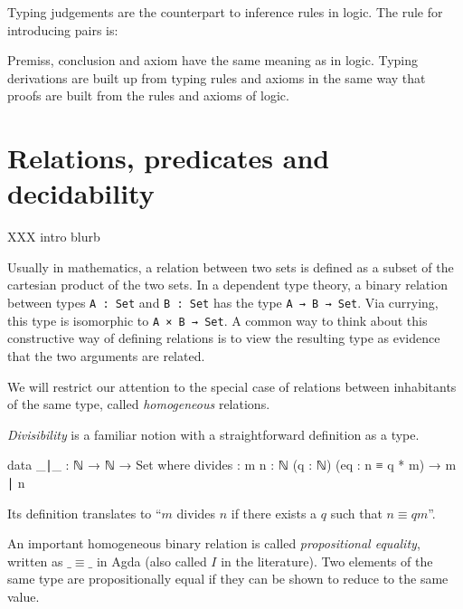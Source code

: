 Typing judgements are the counterpart to inference rules in logic. The rule for introducing pairs is:

\begin{figure}[h]
\begin{prooftree}
\end{prooftree}
\end{figure}

Premiss, conclusion and axiom have the same meaning as in logic. Typing derivations are built up from typing rules and axioms in the same way that proofs are built from the rules and axioms of logic.

\section{Relations, predicates and decidability}

XXX intro blurb


Usually in mathematics, a relation between two sets is defined as a subset of the cartesian product of the two sets. In a dependent type theory, a binary relation between types \texttt{A : Set} and \texttt{B : Set} has the type \texttt{A → B → Set}. Via currying, this type is isomorphic to \texttt{A × B → Set}. A common way to think about this constructive way of defining relations is to view the resulting type as evidence that the two arguments are related.

We will restrict our attention to the special case of relations between inhabitants of the same type, called \emph{homogeneous} relations.

\emph{Divisibility} is a familiar notion with a straightforward definition as a type.

\begin{listing}[h]
\begin{agdacode}
data _∣_ : ℕ → ℕ → Set where
  divides : {m n : ℕ} (q : ℕ) (eq : n ≡ q * m) → m ∣ n
\end{agdacode}
\end{listing}

Its definition translates to \enquote{\(m\) divides \(n\) if there exists a \(q\) such that \(n \equiv q m\)}.

An important homogeneous binary relation is called \emph{propositional equality}, written as \(\_\!\!\equiv\!\!\_\) in Agda (also called \(I\) in the literature). Two elements of the same type are propositionally equal if they can be shown to reduce to the same value.

